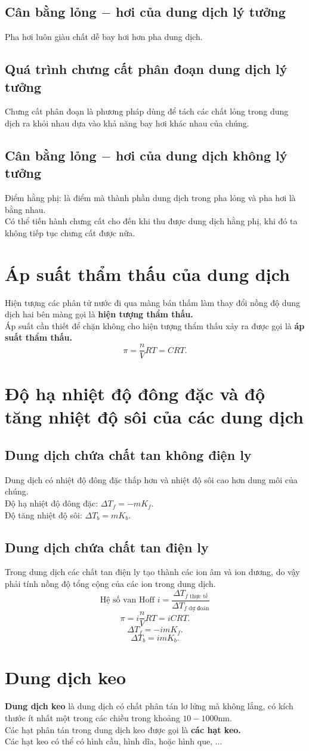 \subsection{Cân bằng lỏng $-$ hơi của dung dịch lý tưởng}
Pha hơi luôn giàu chất dễ bay hơi hơn pha dung dịch.
\subsection{Quá trình chưng cất phân đoạn dung dịch lý tưởng}
Chưng cất phân đoạn là phương pháp dùng để tách các chất lỏng trong dung dịch ra khỏi nhau dựa vào khả năng bay hơi khác nhau của chúng.
\subsection{Cân bằng lỏng $-$ hơi của dung dịch không lý tưởng}
Điểm hằng phị: là điểm mà thành phần dung dịch trong pha lỏng và pha hơi là bằng nhau.\\
Có thể tiến hành chưng cất cho đến khi thu được dung dịch hằng phị, khi đó ta không tiếp tục chưng cất được nữa.
\section{Áp suất thẩm thấu của dung dịch}
Hiện tượng các phân tử nước đi qua màng bán thấm làm thay đổi nồng độ dung dịch hai bên màng gọi là \textbf{hiện tượng thẩm thấu.}\\
Áp suất cần thiết để chặn không cho hiện tượng thẩm thấu xảy ra được gọi là \textbf{áp suất thẩm thấu.}
$$\pi = \frac{n}{V}RT = CRT.$$
\section{Độ hạ nhiệt độ đông đặc và độ tăng nhiệt độ sôi của các dung dịch}
\subsection{Dung dịch chứa chất tan không điện ly}
Dung dịch có nhiệt độ đông đặc thấp hơn và nhiệt độ sôi cao hơn dung môi của chúng.\\
Độ hạ nhiệt độ đông đặc: $\Delta T_f = -m K_f.$\\
Độ tăng nhiệt độ sôi: $\Delta T_b = mK_b.$
\subsection{Dung dịch chứa chất tan điện ly}
Trong dung dịch các chất tan điện ly tạo thành các ion âm và ion dương, do vậy phải tính nồng độ tổng cộng của các ion trong dung dịch.
$$\text{Hệ số van Hoff } i = \frac{\Delta T_{f \text{ thực tế}}}{\Delta T_{f \text{ dự đoán}}}$$
$$\pi = i \frac{n}{V}RT = iCRT.$$
$$\Delta T_f = - i m K_f.$$
$$\Delta T_b = i mK_b.$$
\section{Dung dịch keo}
\textbf{Dung dịch keo} là dung dịch có chất phân tán lơ lửng mà không lắng, có kích thước ít nhất một trong các chiều trong khoảng $10 - 1000 \mathrm{nm}.$\\
Các hạt phân tán trong dung dịch keo được gọi là \textbf{các hạt keo.}\\
Các hạt keo có thể có hình cầu, hình dĩa, hoặc hình que, ...